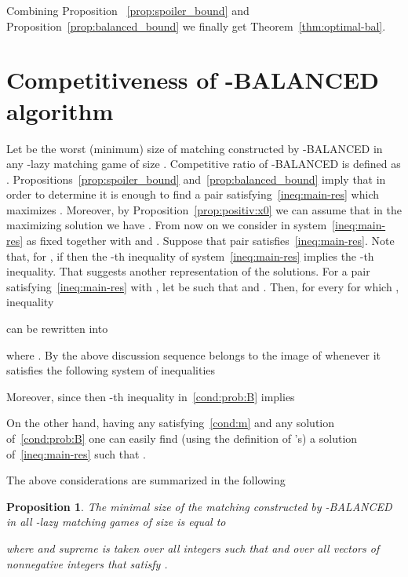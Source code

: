 \documentclass[12pt]{amsart}
\newtheorem{prop}[theorem]{Proposition}
\theoremstyle{definition}
\newcommand{\Alg}[0]{\textsf{BALANCED}\xspace}
\begin{document}
Combining Proposition ~\ref{prop:spoiler_bound} and Proposition~\ref{prop:balanced_bound} we finally get Theorem~\ref{thm:optimal-bal}.

\section{Competitiveness of -\Alg{} algorithm}
\label{sect:comp}


Let  be the worst (minimum) size of matching constructed by -\Alg{} in any -lazy matching game of size .
Competitive ratio of -\Alg{} is defined as .
Propositions~\ref{prop:spoiler_bound} and~\ref{prop:balanced_bound} imply that in order to determine  it is enough to find a pair  satisfying~\eqref{ineq:main-res} which maximizes .
Moreover, by Proposition~\ref{prop:positiv:x0} we can assume that in the maximizing solution we have .
From now on we consider  in system~\eqref{ineq:main-res} as fixed together with  and .
Suppose that pair  satisfies~\eqref{ineq:main-res}.
Note that, for , if  then the -th inequality of system~\eqref{ineq:main-res} implies the -th inequality.
That suggests another representation of the solutions.
For a pair  satisfying~\eqref{ineq:main-res} with , let  be such that  and .
Then, for every  for which , inequality 

can be rewritten into 

where .
By the above discussion sequence  belongs to the image of  whenever it satisfies the following system of inequalities 

Moreover, since  then -th inequality in~\eqref{cond:prob:B} implies

On the other hand, having any  satisfying~\eqref{cond:m} and any solution  of~\eqref{cond:prob:B} one can easily
find (using the definition of 's) a solution  of~\eqref{ineq:main-res} such that .


The above considerations are summarized in the following
\begin{prop}
 The minimal size of the matching constructed by -\Alg{} in all -lazy matching games of size  is equal to
 
 where  and supreme is taken over all integers  such that  and over all vectors  of nonnegative integers that satisfy .
\end{prop}
\end{document}
